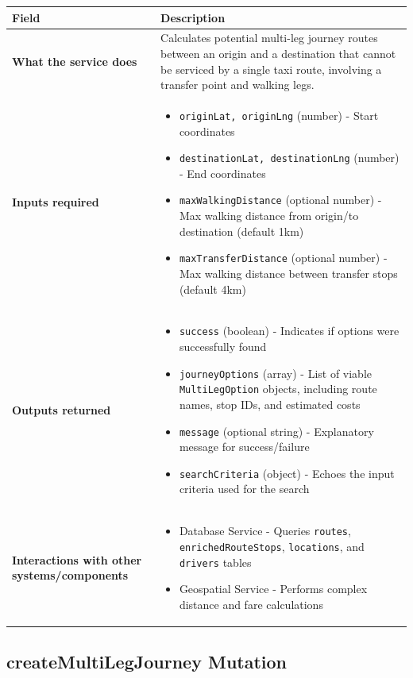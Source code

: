 \documentclass[11pt,a4paper]{article}
\begin{document}
\begin{longtable}{|p{4cm}|p{12cm}|}
\hline
\textbf{Field} & \textbf{Description} \\
\hline
\textbf{What the service does} & 
Calculates potential multi-leg journey routes between an origin and a destination that cannot be serviced by a single taxi route, involving a transfer point and walking legs. \\
\hline
\textbf{Inputs required} & 
\begin{itemize}[nosep]
\item \texttt{originLat, originLng} (number) - Start coordinates
\item \texttt{destinationLat, destinationLng} (number) - End coordinates
\item \texttt{maxWalkingDistance} (optional number) - Max walking distance from origin/to destination (default 1km)
\item \texttt{maxTransferDistance} (optional number) - Max walking distance between transfer stops (default 4km)
\end{itemize} \\
\hline
\textbf{Outputs returned} & 
\begin{itemize}[nosep]
\item \texttt{success} (boolean) - Indicates if options were successfully found
\item \texttt{journeyOptions} (array) - List of viable \texttt{MultiLegOption} objects, including route names, stop IDs, and estimated costs
\item \texttt{message} (optional string) - Explanatory message for success/failure
\item \texttt{searchCriteria} (object) - Echoes the input criteria used for the search
\end{itemize} \\
\hline
\textbf{Interactions with other systems/components} & 
\begin{itemize}[nosep]
\item Database Service - Queries \texttt{routes}, \texttt{enrichedRouteStops}, \texttt{locations}, and \texttt{drivers} tables
\item Geospatial Service - Performs complex distance and fare calculations
\end{itemize} \\
\hline
\end{longtable}

\subsection{createMultiLegJourney Mutation}
\end{document}
